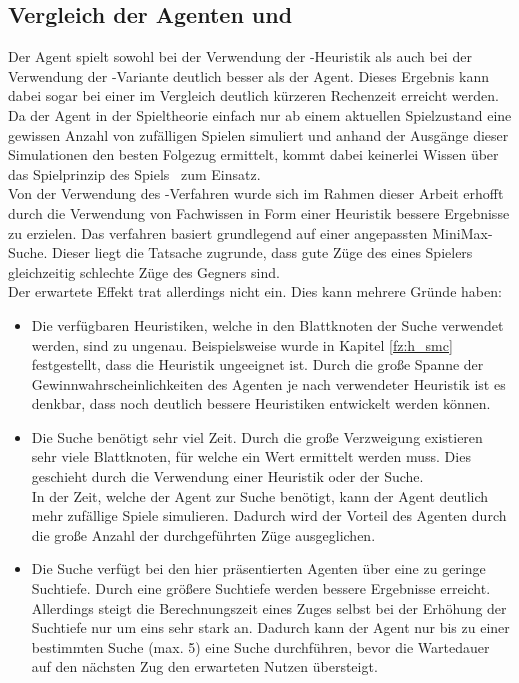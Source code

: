 \subsection{Vergleich der Agenten \mxZitat{\mc} und \mxZitat{\abp}}
\authorpatrick
\label{subsec:Fazit:AgentenVgl}
Der \mxZitat{\mc} Agent spielt sowohl bei der Verwendung der -Heuristik als auch bei der Verwendung der \mc -Variante deutlich besser als der \mxZitat{\abp} Agent. Dieses Ergebnis kann dabei sogar bei einer im Vergleich deutlich kürzeren Rechenzeit erreicht werden.
\\Da der \mxZitat{\mc} Agent in der Spieltheorie einfach nur ab einem aktuellen Spielzustand eine gewissen Anzahl von zufälligen Spielen simuliert und anhand der Ausgänge dieser Simulationen den besten Folgezug ermittelt, kommt dabei keinerlei Wissen über das Spielprinzip des Spiels \ot\ zum Einsatz. 
\\Von der Verwendung des \mxZitat{\abab}-Verfahren wurde sich im Rahmen dieser Arbeit erhofft durch die Verwendung von Fachwissen in Form einer Heuristik bessere Ergebnisse zu erzielen. Das verfahren basiert grundlegend auf einer angepassten MiniMax-Suche. Dieser liegt die Tatsache zugrunde, dass gute Züge des eines Spielers gleichzeitig schlechte Züge des Gegners sind.
\\Der erwartete Effekt trat allerdings nicht ein. Dies kann mehrere Gründe haben:
\begin{itemize}
\item Die verfügbaren Heuristiken, welche in den Blattknoten der \mxZitat{\abp} Suche verwendet werden, sind zu ungenau. Beispielsweise wurde in Kapitel \ref{fz:h_smc} festgestellt, dass die Heuristik  ungeeignet ist. Durch die große Spanne der Gewinnwahrscheinlichkeiten des \mxZitat{\abp} Agenten je nach verwendeter Heuristik ist es denkbar, dass noch deutlich bessere Heuristiken entwickelt werden können.
\item Die \mxZitat{\abp} Suche benötigt sehr viel Zeit. Durch die große Verzweigung existieren sehr viele Blattknoten, für welche ein Wert ermittelt werden muss. Dies geschieht durch die Verwendung einer Heuristik oder der \mxZitat{\mc} Suche.
\\In der Zeit, welche der \mxZitat{\abp} Agent zur Suche benötigt, kann der \mxZitat{\mc} Agent deutlich mehr zufällige Spiele simulieren. Dadurch wird der Vorteil des \mxZitat{\abp} Agenten durch die große Anzahl der durchgeführten Züge ausgeglichen.
\item Die \mxZitat{\abp} Suche verfügt bei den hier präsentierten Agenten über eine zu geringe Suchtiefe. Durch eine größere Suchtiefe werden bessere Ergebnisse erreicht. Allerdings steigt die Berechnungszeit eines Zuges selbst bei der Erhöhung der Suchtiefe nur um eins sehr stark an. Dadurch kann der Agent nur bis zu einer bestimmten Suche (max. 5) eine \mxZitat{\abp} Suche durchführen, bevor die Wartedauer auf den nächsten Zug den erwarteten Nutzen übersteigt. 
\end{itemize} 

